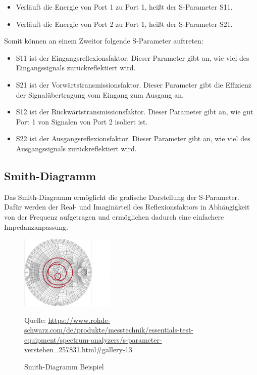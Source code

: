 \begin{itemize}
    \item Verläuft die Energie von Port 1 zu Port 1, heißt der S-Parameter S11.
    \item Verläuft die Energie von Port 2 zu Port 1, heißt der S-Parameter S21.
\end{itemize}
Somit können an einem Zweitor folgende S-Parameter auftreten:
\begin{itemize}
    \item S11 ist der Eingangsreflexionsfaktor. Dieser Parameter gibt an, wie viel des Eingangssignals zurückreflektiert wird.
    \item S21 ist der Vorwärtstransmissionsfaktor. Dieser Parameter gibt die Effizienz der Signalübertragung vom Eingang zum Ausgang an.
    \item S12 ist der Rückwärtstransmissionsfaktor. Dieser Parameter gibt an, wie gut Port 1 von Signalen von Port 2 isoliert ist.
    \item S22 ist der Ausgangsreflexionsfaktor. Dieser Parameter gibt an, wie viel des Ausgangssignals zurückreflektiert wird.
\end{itemize}

\subsection{Smith-Diagramm}
Das Smith-Diagramm ermöglicht die grafische Darstellung der S-Parameter.
Dafür werden der Real- und Imaginärteil des Reflexionsfaktors in Abhängigkeit von der Frequenz
aufgetragen und ermöglichen dadurch eine einfachere Impedanzanpassung.
\begin{figure}[H]
    \centering
    \includegraphics[width=0.4\textwidth]{Pictures/SmithDiagram.png}
    \caption{Smith-Diagramm Beispiel}
    \footnotesize{Quelle: \url{https://www.rohde-schwarz.com/de/produkte/messtechnik/essentials-test-equipment/spectrum-analyzers/s-parameter-verstehen_257831.html#gallery-13}}
\end{figure}

\clearpage